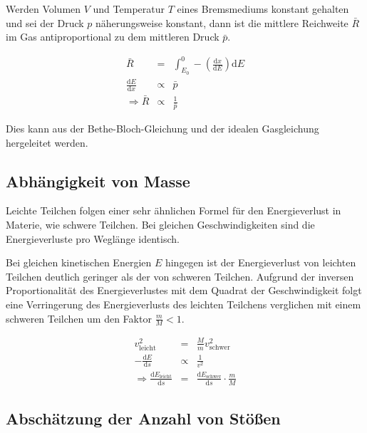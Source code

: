 \documentclass[12pt,a4paper]{scrartcl}
\numberwithin{equation}{section} %
\renewcommand{\[}{} %
\renewcommand{\]}{\noindent} %
\begin{document}
Werden Volumen \(V\) und Temperatur \(T\) eines Bremsmediums konstant
gehalten und sei der Druck \(p\) näherungsweise konstant, dann ist die
mittlere Reichweite \(\bar R\) im Gas antiproportional zu dem mittleren
Druck \(\bar p\).

\[
\begin{eqnarray}
        \bar{R} &=&
                \int_{E_0}^{0} -\left(\frac{\mathrm dx}{\mathrm dE}\right) \mathrm dE \\
        \frac{\mathrm dE}{\mathrm dx} &\propto& \bar p \\
    \Rightarrow \bar R &\propto& \frac{1}{\bar p}
\end{eqnarray}
\]

Dies kann aus der Bethe-Bloch-Gleichung und der idealen Gasgleichung
hergeleitet werden.

\hypertarget{abhuxe4ngigkeit-von-masse}{%
\subsection{Abhängigkeit von Masse}\label{abhuxe4ngigkeit-von-masse}}

Leichte Teilchen folgen einer sehr ähnlichen Formel für den
Energieverlust in Materie, wie schwere Teilchen. Bei gleichen
Geschwindigkeiten sind die Energieverluste pro Weglänge identisch.

Bei gleichen kinetischen Energien \(E\) hingegen ist der Energieverlust
von leichten Teilchen deutlich geringer als der von schweren Teilchen.
Aufgrund der inversen Proportionalität des Energieverlustes mit dem
Quadrat der Geschwindigkeit folgt eine Verringerung des Energieverlusts
des leichten Teilchens verglichen mit einem schweren Teilchen um den
Faktor \(\frac{m}{M} < 1\).

\[
\begin{eqnarray}
        v_\mathrm{leicht}^2 & = &\frac{M}{m} v_\mathrm{schwer}^2 \\
        - \frac{\mathrm dE}{\mathrm ds} &\propto& \frac{1}{v^2} \\
        \Rightarrow \frac{\mathrm dE_\mathrm{leicht}}{\mathrm ds}
                &=& \frac{\mathrm dE_\mathrm{schwer}}{\mathrm ds}
                        \cdot \frac{m}{M}
\end{eqnarray}
\]

\hypertarget{abschuxe4tzung-der-anzahl-von-stuxf6uxdfen}{%
\subsection{Abschätzung der Anzahl von
Stößen}\label{abschuxe4tzung-der-anzahl-von-stuxf6uxdfen}}
\end{document}
